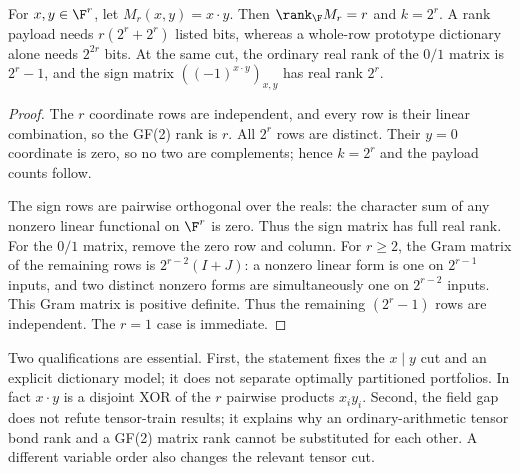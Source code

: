 \begin{proposition}
\label{prop:gap}
For $x,y\in\F^r$, let $M_r(x,y)=x\cdot y$. Then $\rank_{\F}M_r=r$ and $k=2^r$. A rank payload needs $r(2^r+2^r)$ listed bits, whereas a whole-row prototype dictionary alone needs $2^{2r}$ bits. At the same cut, the ordinary real rank of the $0/1$ matrix is $2^r-1$, and the sign matrix $((-1)^{x\cdot y})_{x,y}$ has real rank $2^r$.
\end{proposition}
\begin{proof}
The $r$ coordinate rows are independent, and every row is their linear combination, so the GF(2) rank is $r$. All $2^r$ rows are distinct. Their $y=0$ coordinate is zero, so no two are complements; hence $k=2^r$ and the payload counts follow.

The sign rows are pairwise orthogonal over the reals: the character sum of any nonzero linear functional on $\F^r$ is zero. Thus the sign matrix has full real rank. For the $0/1$ matrix, remove the zero row and column. For $r\ge2$, the Gram matrix of the remaining rows is $2^{r-2}(I+J)$: a nonzero linear form is one on $2^{r-1}$ inputs, and two distinct nonzero forms are simultaneously one on $2^{r-2}$ inputs. This Gram matrix is positive definite. Thus the remaining $(2^r-1)$ rows are independent. The $r=1$ case is immediate.
\end{proof}

Two qualifications are essential. First, the statement fixes the $x\mid y$ cut and an explicit dictionary model; it does not separate optimally partitioned portfolios. In fact $x\cdot y$ is a disjoint XOR of the $r$ pairwise products $x_i y_i$. Second, the field gap does not refute tensor-train results\cite{onaka2025}; it explains why an ordinary-arithmetic tensor bond rank and a GF(2) matrix rank cannot be substituted for each other. A different variable order also changes the relevant tensor cut.
